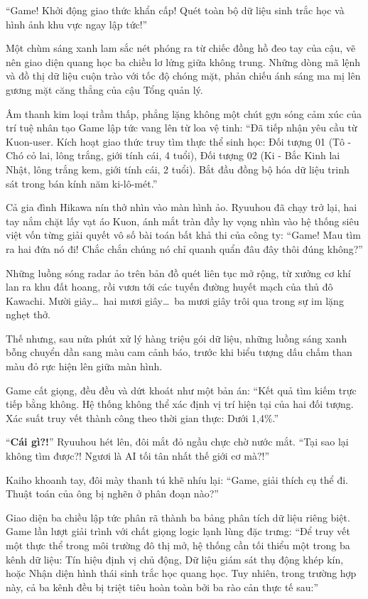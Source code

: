 \documentclass[../main.tex]{subfiles}
\begin{document}
``Game! Khởi động giao thức khẩn cấp! Quét toàn bộ dữ liệu sinh trắc học và hình ảnh khu vực ngay lập tức!''

Một chùm sáng xanh lam sắc nét phóng ra từ chiếc đồng hồ đeo tay của cậu, vẽ nên giao diện quang học ba chiều lơ lửng giữa không trung. Những dòng mã lệnh và đồ thị dữ liệu cuộn trào với tốc độ chóng mặt, phản chiếu ánh sáng ma mị lên gương mặt căng thẳng của cậu Tổng quản lý.

Âm thanh kim loại trầm thấp, phẳng lặng không một chút gợn sóng cảm xúc của trí tuệ nhân tạo Game lập tức vang lên từ loa vệ tinh: ``Đã tiếp nhận yêu cầu từ Kuon-user. Kích hoạt giao thức truy tìm thực thể sinh học: Đối tượng 01 (Tô - Chó cỏ lai, lông trắng, giới tính cái, 4 tuổi), Đối tượng 02 (Ki - Bắc Kinh lai Nhật, lông trắng kem, giới tính cái, 2 tuổi). Bắt đầu đồng bộ hóa dữ liệu trinh sát trong bán kính năm ki-lô-mét.''

Cả gia đình Hikawa nín thở nhìn vào màn hình ảo. Ryuuhou đã chạy trở lại, hai tay nắm chặt lấy vạt áo Kuon, ánh mắt tràn đầy hy vọng nhìn vào hệ thống siêu việt vốn từng giải quyết vô số bài toán bất khả thi của công ty: ``Game! Mau tìm ra hai đứa nó đi! Chắc chắn chúng nó chỉ quanh quẩn đâu đây thôi đúng không?''

Những luồng sóng radar ảo trên bản đồ quét liên tục mở rộng, từ xưởng cơ khí lan ra khu đất hoang, rồi vươn tới các tuyến đường huyết mạch của thủ đô Kawachi. Mười giây\dots\ hai mươi giây\dots\ ba mươi giây trôi qua trong sự im lặng nghẹt thở.

Thế nhưng, sau nửa phút xử lý hàng triệu gói dữ liệu, những luồng sáng xanh bỗng chuyển dần sang màu cam cảnh báo, trước khi biểu tượng dấu chấm than màu đỏ rực hiện lên giữa màn hình.

Game cất giọng, đều đều và dứt khoát như một bản án: ``Kết quả tìm kiếm trực tiếp bằng không. Hệ thống không thể xác định vị trí hiện tại của hai đối tượng. Xác suất truy vết thành công theo thời gian thực: Dưới 1,4\%.''

``\textbf{Cái gì?!}'' Ryuuhou hét lên, đôi mắt đỏ ngầu chực chờ nước mắt. ``Tại sao lại không tìm được?! Ngươi là AI tối tân nhất thế giới cơ mà?!''

Kaiho khoanh tay, đôi mày thanh tú khẽ nhíu lại: ``Game, giải thích cụ thể đi. Thuật toán của ông bị nghẽn ở phân đoạn nào?''

Giao diện ba chiều lập tức phân rã thành ba bảng phân tích dữ liệu riêng biệt. Game lần lượt giải trình với chất giọng logic lạnh lùng đặc trưng: ``Để truy vết một thực thể trong môi trường đô thị mở, hệ thống cần tối thiểu một trong ba kênh dữ liệu: Tín hiệu định vị chủ động, Dữ liệu giám sát thụ động khép kín, hoặc Nhận diện hình thái sinh trắc học quang học. Tuy nhiên, trong trường hợp này, cả ba kênh đều bị triệt tiêu hoàn toàn bởi ba rào cản thực tế sau:''
\end{document}
